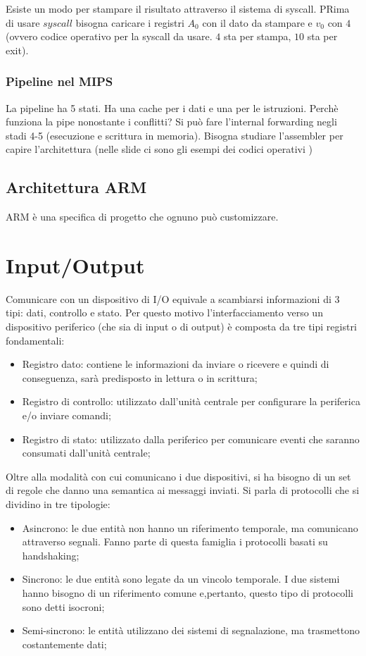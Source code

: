 \documentclass{article}
\begin{document}
Esiste un modo per stampare il risultato attraverso il sistema di syscall.
PRima di usare $syscall$ bisogna caricare i registri $A_0$ con il dato da stampare 
e $v_0$ con $4$ (ovvero codice operativo per la syscall da usare. $4$ sta per stampa, 
$10$ sta per exit).
\subsubsection{Pipeline nel MIPS}
La pipeline ha 5 stati. Ha una cache per i dati e una per le istruzioni.
Perchè funziona la pipe nonostante i conflitti? Si può fare l'internal forwarding 
negli stadi 4-5 (esecuzione e scrittura in memoria). Bisogna studiare l'assembler 
per capire l'architettura (nelle slide ci sono gli esempi dei codici operativi )

\subsection{Architettura ARM}
ARM è una specifica di progetto che ognuno può customizzare.

\clearpage
\section{Input/Output}
Comunicare con un dispositivo di I/O equivale a scambiarsi informazioni di 3 tipi: dati,
controllo e stato. Per questo motivo l'interfacciamento verso un dispositivo periferico 
(che sia di input o di output) è composta da tre tipi registri fondamentali:
\begin{itemize}
  \item Registro dato: contiene le informazioni da inviare o ricevere e quindi 
    di conseguenza, sarà predisposto in lettura o in scrittura;
  \item Registro di controllo: utilizzato dall'unità centrale per configurare
    la periferica e/o inviare comandi;
  \item Registro di stato: utilizzato dalla periferico per comunicare eventi 
    che saranno consumati dall'unità centrale;
\end{itemize}

Oltre alla modalità con cui comunicano i due dispositivi, si ha bisogno di un 
set di regole che danno una semantica ai messaggi inviati. Si parla di 
protocolli che si dividino in tre tipologie:

\begin{itemize}
  \item Asincrono: le due entità non hanno un riferimento temporale,
    ma comunicano attraverso segnali. 
    Fanno parte di questa famiglia i protocolli basati su handshaking;
  \item Sincrono: le due entità sono legate da un vincolo temporale. I due 
    sistemi hanno bisogno di un riferimento comune e,pertanto, questo tipo di 
    protocolli sono detti isocroni;
  \item Semi-sincrono: le entità utilizzano dei sistemi di segnalazione, ma 
    trasmettono costantemente dati;
\end{itemize}
\end{document}
